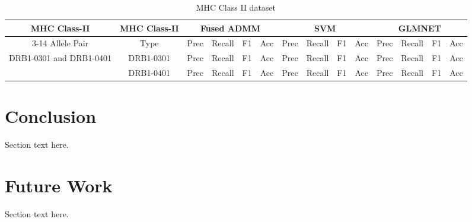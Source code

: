 \documentclass[conference,10pt,draftclsnofoot,onecolumn]{IEEEtran}
\begin{document}
\begin{table}[!t]
\caption{MHC Class II dataset}
\label{tab:resultTable}
\centering
\begin{tabular}{|c|c|c|c|c|c|c|c|c|c|c|c|c|c|}
\hline
\multirow{2}{*}{MHC Class-II} & \multirow{2}{*}{MHC Class-II} & \multicolumn{4}{c|}{Fused ADMM} & \multicolumn{4}{c|}{SVM} & \multicolumn{4}{c|}{GLMNET}\\
\cline{3-14}
Allele Pair& Type & Prec & Recall & F1 & Acc & Prec & Recall & F1 & Acc & Prec & Recall & F1 & Acc\\
\hline
\multirow{2}{*}{DRB1-0301 and DRB1-0401} & \multirow{1}{*}{DRB1-0301} & Prec & Recall & F1 & Acc & Prec & Recall & F1 & Acc & Prec & Recall & F1 & Acc\\
\cline{2-14}
& DRB1-0401 & Prec & Recall & F1 & Acc & Prec & Recall & F1 & Acc & Prec & Recall & F1 & Acc\\
\hline
\end{tabular}
\end{table}


\section{Conclusion}
\label{sec:conclusion}
Section text here.

\section{Future Work}
\label{sec:futureWork}
Section text here.


%
%
\end{document}
